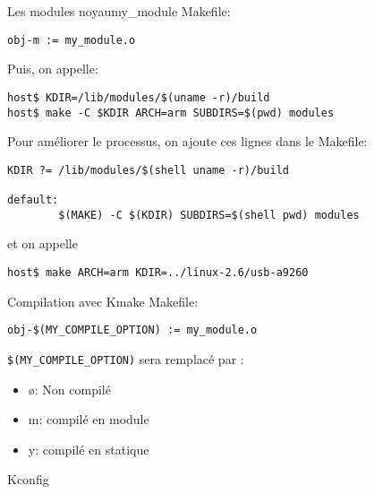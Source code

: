 \begin{frame}[fragile=singleslide]{Les modules noyau}{my\_module}
  Makefile:
  \begin{lstlisting}
obj-m := my_module.o  
  \end{lstlisting}
  Puis, on appelle:
  \begin{lstlisting}
host$ KDIR=/lib/modules/$(uname -r)/build
host$ make -C $KDIR ARCH=arm SUBDIRS=$(pwd) modules
  \end{lstlisting} %
  Pour améliorer le processus, on ajoute ces lignes dans le Makefile:
  \begin{lstlisting}
KDIR ?= /lib/modules/$(shell uname -r)/build

default:
        $(MAKE) -C $(KDIR) SUBDIRS=$(shell pwd) modules
  \end{lstlisting}
  et on appelle
  \begin{lstlisting}
host$ make ARCH=arm KDIR=../linux-2.6/usb-a9260 
  \end{lstlisting} %
\end{frame}

\begin{frame}[fragile=singleslide]{Compilation avec Kmake}
  Makefile:
  \begin{lstlisting}
obj-$(MY_COMPILE_OPTION) := my_module.o  
  \end{lstlisting} %
  \lstinline+$(MY_COMPILE_OPTION)+ sera remplacé par :
  \begin{itemize}
  \item ø: Non compilé
  \item m: compilé en module
  \item y: compilé en statique
  \end{itemize}
  Kconfig
  
\end{frame}

